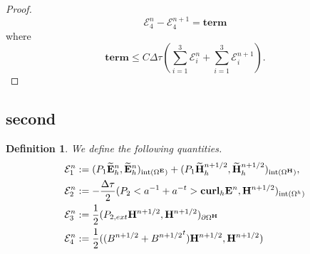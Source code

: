 \documentclass[12pt,reqno]{amsart}
\newcommand{\curl}{{\bf curl}}
\newcommand{\e}{{\bf E}}
\newcommand{\h}{{\bf H}}
\newtheorem{defi}[theorem]{Definition}
\theoremstyle{definition}
\numberwithin{equation}{section}
\newcommand{\intr}[1]{\mathrm{int}(#1)}
\def\Gw{\Omega}     \def\Gx{\Xi}         \def\Gy{\Psi}
\begin{document}
\begin{proof}
		$$\mathcal{E}_4^n-
	\mathcal{E}_4^{n+1}=
	\mathbf{term}
		$$
		where 
		$$
		\mathbf{term}\leq C \Delta \tau( \sum_{i=1}^3\mathcal{E}_i^n+
		\sum_{i=1}^3\mathcal{E}_i^{n+1}).
		$$
\end{proof}
	
\newpage
\subsection{second}
\begin{defi}
	We define the following quantities.
	\begin{align*}
	&
	\mathcal{E}_1^{n}:=
	(P_1\widetilde{\e}_h^{n},\widetilde{\e}_h^{n})_{\intr{\Gw^\e}}+
	(P_1\widetilde{\h}_h^{n+1/2},\widetilde{\h}_h^{n+1/2})_{\intr{\Gw^\h}}, \\&
	\mathcal{E}_2^{n}:=-\frac{\Delta \tau}{2}(P_2<a^{-1}+a^{-t}>\curl_h \e^{n},\h^{n+1/2})_{\intr{\Gw^{h}}}\\&
		\mathcal{E}_3^{n}:=\frac{1}{2}(P_{2,ext}\h^{n+1/2},\h^{n+1/2})_{\partial \Gw^\h}\\&
	\mathcal{E}_4^{n}:=\frac{1}{2}((B^{n+1/2}+{B^{n+1/2}}^t)\h^{n+1/2},\h^{n+1/2})
\end{align*}
\end{defi}
\end{document}
